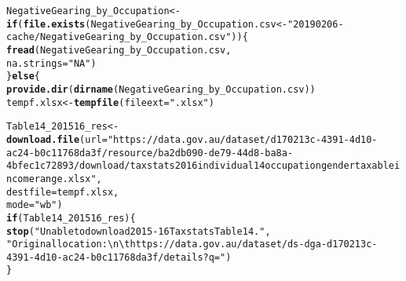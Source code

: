 \documentclass[b5paper,11pt]{article}\usepackage[]{graphicx}\usepackage[]{color}
\makeatletter
\newcommand{\hlstr}[1]{\textcolor[rgb]{0.192,0.494,0.8}{#1}}%
\newcommand{\hlstd}[1]{\textcolor[rgb]{0.345,0.345,0.345}{#1}}%
\newcommand{\hlkwa}[1]{\textcolor[rgb]{0.161,0.373,0.58}{\textbf{#1}}}%
\newcommand{\hlkwb}[1]{\textcolor[rgb]{0.69,0.353,0.396}{#1}}%
\newcommand{\hlkwc}[1]{\textcolor[rgb]{0.333,0.667,0.333}{#1}}%
\newcommand{\hlkwd}[1]{\textcolor[rgb]{0.737,0.353,0.396}{\textbf{#1}}}%
\newenvironment{kframe}{%
 \def\at@end@of@kframe{}%
 \ifinner\ifhmode%
  \def\at@end@of@kframe{\end{minipage}}%
  \begin{minipage}{\columnwidth}%
 \fi\fi%
 \def\FrameCommand##1{\hskip\@totalleftmargin \hskip-\fboxsep
 \colorbox{shadecolor}{##1}\hskip-\fboxsep
     \hskip-\linewidth \hskip-\@totalleftmargin \hskip\columnwidth}%
 \MakeFramed {\advance\hsize-\width
   \@totalleftmargin\z@ \linewidth\hsize
   \@setminipage}}%
 {\par\unskip\endMakeFramed%
 \at@end@of@kframe}
\newenvironment{knitrout}{}{} %
\makeatother
\begin{document}
\begin{knitrout}
\color{fgcolor}\begin{kframe}
\begin{alltt}
\hlstd{NegativeGearing_by_Occupation} \hlkwb{<-}
  \hlkwa{if} \hlstd{(}\hlkwd{file.exists}\hlstd{(NegativeGearing_by_Occupation.csv} \hlkwb{<-} \hlstr{"20190206-cache/NegativeGearing_by_Occupation.csv"}\hlstd{)) \{}
    \hlkwd{fread}\hlstd{(NegativeGearing_by_Occupation.csv,}
          \hlkwc{na.strings} \hlstd{=} \hlstr{"NA"}\hlstd{)}
  \hlstd{\}} \hlkwa{else} \hlstd{\{}
    \hlkwd{provide.dir}\hlstd{(}\hlkwd{dirname}\hlstd{(NegativeGearing_by_Occupation.csv))}
     \hlstd{tempf.xlsx} \hlkwb{<-} \hlkwd{tempfile}\hlstd{(}\hlkwc{fileext} \hlstd{=} \hlstr{".xlsx"}\hlstd{)}

     \hlstd{Table14_201516_res} \hlkwb{<-}
       \hlkwd{download.file}\hlstd{(}\hlkwc{url} \hlstd{=} \hlstr{"https://data.gov.au/dataset/d170213c-4391-4d10-ac24-b0c11768da3f/resource/ba2db090-de79-44d8-ba8a-4bfec1c72893/download/taxstats2016individual14occupationgendertaxableincomerange.xlsx"}\hlstd{,}
                     \hlkwc{destfile} \hlstd{= tempf.xlsx,}
                     \hlkwc{mode} \hlstd{=} \hlstr{"wb"}\hlstd{)}
     \hlkwa{if} \hlstd{(Table14_201516_res) \{}
       \hlkwd{stop}\hlstd{(}\hlstr{"Unable to download 2015-16 Taxstats Table 14. "}\hlstd{,}
            \hlstr{"Original location: \textbackslash{}n\textbackslash{}thttps://data.gov.au/dataset/ds-dga-d170213c-4391-4d10-ac24-b0c11768da3f/details?q="}\hlstd{)}
     \hlstd{\}}


\end{alltt}
\end{kframe}
\end{knitrout}
\end{document}
